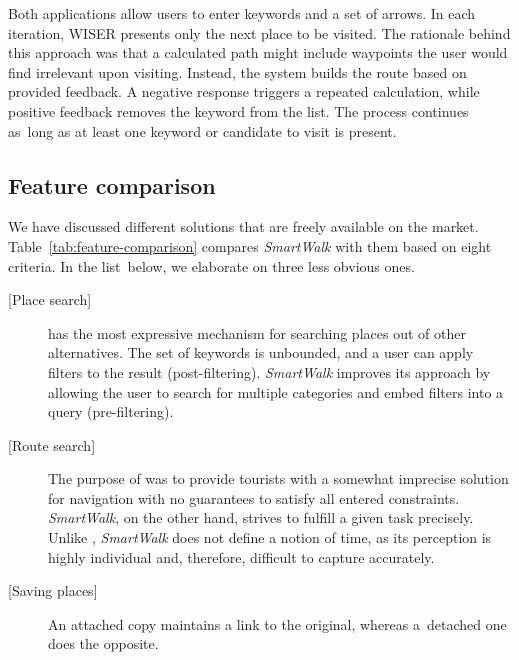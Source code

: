 Both applications allow users to enter keywords and a set of arrows. In each iteration, WISER presents only the next place to be visited. The rationale behind this approach was that a calculated path might include waypoints the user would find irrelevant upon visiting. Instead, the system builds the route based on provided feedback. A negative response triggers a repeated calculation, while positive feedback removes the keyword from the list. The process continues as~long as at least one keyword or candidate to visit is present.

\subsection{Feature comparison}

We have discussed different solutions that are freely available on the market. Table~\ref{tab:feature-comparison} compares \emph{SmartWalk} with them based on eight criteria. In the list~be\-low, we elaborate on three less obvious ones.

\begin{description}
\item[{[Place search]}] \emph{} has the most expressive mechanism for searching places out of other alternatives. The set of keywords is unbounded, and a user can apply filters to the result (post-filtering). \emph{SmartWalk} improves its approach by allowing the user to search for multiple categories and embed filters into a query (pre-filtering).
\item[{[Route search]}] The purpose of \emph{} was to provide tourists with a somewhat imprecise solution for navigation with no guarantees to satisfy all entered constraints. \emph{SmartWalk}, on the other hand, strives to fulfill a given task precisely. Unlike \emph{}, \emph{SmartWalk} does not define a notion of time, as its perception is highly individual and, therefore, difficult to capture accurately.
\item[{[Saving places]}] An attached copy maintains a link to the original, whereas a~de\-tached one does the opposite.
\end{description}

\newpage

